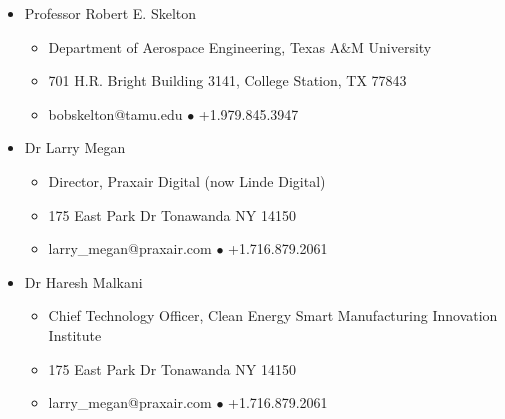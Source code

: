 \documentclass[10pt]{article}
\newenvironment{itemizeZero}{\begin{itemize}
\setlength{\itemsep}{0pt}
}
{\end{itemize}}
\begin{document}
\begin{itemize}
\item Professor Robert E. Skelton
\begin{itemize}[nosep]
\item Department of Aerospace Engineering, Texas A\&M University
\item 701 H.R. Bright Building 3141, College Station, TX 77843
\item bobskelton@tamu.edu \;$\bullet$\;  +1.979.845.3947
\end{itemize}

\item Dr Larry Megan
\begin{itemize}[nosep]
\item Director, Praxair Digital (now Linde Digital)
\item 175 East Park Dr Tonawanda NY 14150
\item larry\_megan@praxair.com \;$\bullet$\;  +1.716.879.2061
\end{itemize}

\item Dr Haresh Malkani
\begin{itemize}[nosep]
\item Chief Technology Officer, Clean Energy Smart Manufacturing Innovation Institute
\item 175 East Park Dr Tonawanda NY 14150
\item larry\_megan@praxair.com \;$\bullet$\;  +1.716.879.2061
\end{itemize}





\end{itemize}
\end{document}
